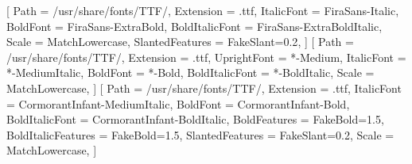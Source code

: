 

\setsansfont{FiraSans-Regular}[
    Path                    = /usr/share/fonts/TTF/,
    Extension               = .ttf,
    ItalicFont              = FiraSans-Italic,
    BoldFont                = FiraSans-ExtraBold,
    BoldItalicFont          = FiraSans-ExtraBoldItalic,
    Scale                   = MatchLowercase,
    SlantedFeatures         = {FakeSlant=0.2},
]
\setmonofont{JuliaMono}[
    Path            = /usr/share/fonts/TTF/,
    Extension       = .ttf,
    UprightFont     = *-Medium,
    ItalicFont      = *-MediumItalic,
    BoldFont        = *-Bold,
    BoldItalicFont  = *-BoldItalic,
    Scale           = MatchLowercase,
]
\newfontfamily{}[
    Path                    = /usr/share/fonts/TTF/,
    Extension               = .ttf,
    ItalicFont              = CormorantInfant-MediumItalic,
    BoldFont                = CormorantInfant-Bold,
    BoldItalicFont          = CormorantInfant-BoldItalic,
    BoldFeatures            = {FakeBold=1.5},
    BoldItalicFeatures      = {FakeBold=1.5},
    SlantedFeatures         = {FakeSlant=0.2},
    Scale                   = MatchLowercase,
]
